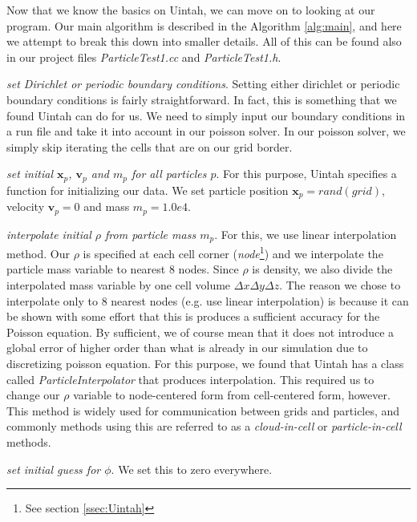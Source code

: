 \documentclass[notitlepage, 12pt]{article}
\begin{document}
Now that we know the basics on Uintah, we can move on to looking at our program. Our main algorithm is described in the Algorithm \ref{alg:main}, 
and here we attempt to break this down into smaller details. All of this can 
be found also in our project files \emph{ParticleTest1.cc} and 
\emph{ParticleTest1.h}.

\emph{set Dirichlet or periodic boundary conditions}. Setting either dirichlet or periodic boundary conditions is fairly straightforward. 
In fact, this is something that we found Uintah can do for us. We need to 
simply input our boundary conditions in a run file and take it into account 
in our poisson solver. In our poisson solver, we simply skip iterating the 
cells that are on our grid border.

\emph{set initial $\mathbf{x}_p$, $\mathbf{v}_p$ and $m_p$ for all particles $p$}. 
For this purpose, Uintah specifies a function for initializing our data. We 
set particle position $\mathbf{x}_p=rand(grid)$, velocity $\mathbf{v}_p=0$ and mass $m_p = 1.0e4$. 

\emph{interpolate initial $\rho$ from particle mass $m_p$}. For this, we use 
linear interpolation method. Our $\rho$ is specified at each cell corner 
(\emph{node}\footnote{See section \ref{ssec:Uintah}}) and we interpolate 
the particle mass variable to nearest $8$ nodes. Since $\rho$ is density, we 
also divide the interpolated mass variable by one cell volume $\Delta x \Delta y \Delta z$. 
The reason we chose to interpolate only to $8$ nearest nodes (e.g. 
use linear interpolation) is because it can be shown with some effort that this is produces a sufficient accuracy 
for the Poisson equation. By sufficient, 
we of course mean that it does not introduce a global error of higher order 
than what is already in our simulation due to discretizing poisson equation.
For this purpose, we 
found that Uintah has a class called \emph{ParticleInterpolator} that 
produces interpolation. This required us to change our $\rho$ variable to 
node-centered form from cell-centered form, however. This method is widely 
used for communication between grids and particles, and commonly methods 
using this are referred to as a \emph{cloud-in-cell} or \emph{particle-in-cell} 
methods.

\emph{set initial guess for $\phi$}. We set this to zero everywhere.
\end{document}
